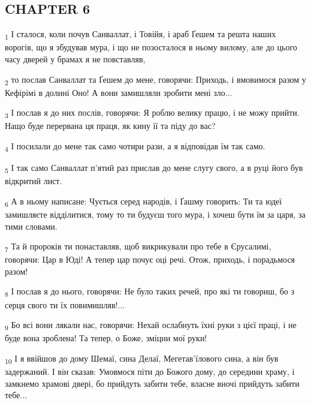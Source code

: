 \subsection{CHAPTER 6}
\begin{tcolorbox}
\textsubscript{1} І сталося, коли почув Санваллат, і Товійя, і араб Ґешем та решта наших ворогів, що я збудував мура, і що не позосталося в ньому вилому, але до цього часу дверей у брамах я не повставляв,
\end{tcolorbox}
\begin{tcolorbox}
\textsubscript{2} то послав Санваллат та Ґешем до мене, говорячи: Приходь, і вмовимося разом у Кефірімі в долині Оно! А вони замишляли зробити мені зло...
\end{tcolorbox}
\begin{tcolorbox}
\textsubscript{3} І послав я до них послів, говорячи: Я роблю велику працю, і не можу прийти. Нащо буде перервана ця праця, як кину її та піду до вас?
\end{tcolorbox}
\begin{tcolorbox}
\textsubscript{4} І посилали до мене так само чотири рази, а я відповідав їм так само.
\end{tcolorbox}
\begin{tcolorbox}
\textsubscript{5} І так само Санваллат п'ятий раз прислав до мене слугу свого, а в руці його був відкритий лист.
\end{tcolorbox}
\begin{tcolorbox}
\textsubscript{6} А в ньому написане: Чується серед народів, і Ґашму говорить: Ти та юдеї замишляєте відділитися, тому то ти будуєш того мура, і хочеш бути їм за царя, за тими словами.
\end{tcolorbox}
\begin{tcolorbox}
\textsubscript{7} Та й пророків ти понаставляв, щоб викрикували про тебе в Єрусалимі, говорячи: Цар в Юді! А тепер цар почує оці речі. Отож, приходь, і порадьмося разом!
\end{tcolorbox}
\begin{tcolorbox}
\textsubscript{8} І послав я до нього, говорячи: Не було таких речей, про які ти говориш, бо з серця свого ти їх повимишляв!...
\end{tcolorbox}
\begin{tcolorbox}
\textsubscript{9} Бо всі вони лякали нас, говорячи: Нехай ослабнуть їхні руки з цієї праці, і не буде вона зроблена! Та тепер, о Боже, зміцни мої руки!
\end{tcolorbox}
\begin{tcolorbox}
\textsubscript{10} І я ввійшов до дому Шемаї, сина Делаї, Мегетав'їлового сина, а він був задержаний. І він сказав: Умовмося піти до Божого дому, до середини храму, і замкнемо храмові двері, бо прийдуть забити тебе, власне вночі прийдуть забити тебе...
\end{tcolorbox}
